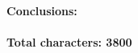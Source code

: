 \documentclass[11pt]{article}
\begin{document}
\paragraph{Conclusions:}


\paragraph{}
\textbf{Total characters: 3800}
\end{document}

